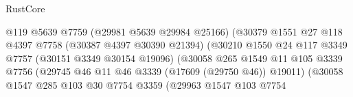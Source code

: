 \begin{lexlean}{RustCore}
\begin{coremodule}
                                                @119
                                                @5639
                                                @7759
                                                (@29981 @5639 @29984 @25166)
                                                (@30379
                                                  @1551
                                                  @27
                                                  @118
                                                  @4397
                                                  @7758
                                                  (@30387 @4397 @30390 @21394)
                                                  (@30210
                                                    @1550
                                                    @24
                                                    @117
                                                    @3349
                                                    @7757
                                                    (@30151 @3349 @30154 @19096)
                                                    (@30058
                                                      @265
                                                      @1549
                                                      @11
                                                      @105
                                                      @3339
                                                      @7756
                                                      (@29745
                                                        @46
                                                        @11
                                                        @46
                                                        @3339
                                                        (@17609 (@29750 @46))
                                                        @19011)
                                                      (@30058
                                                        @1547
                                                        @285
                                                        @103
                                                        @30
                                                        @7754
                                                        @3359
                                                        (@29963
                                                          @1547
                                                          @103
                                                          @7754

\end{coremodule}
\end{lexlean}
